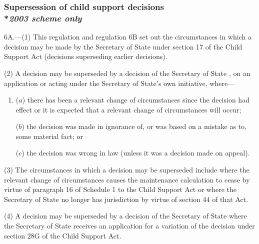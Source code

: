 \documentclass[12pt,a4paper]{article}
\begin{document}

\subsubsection[6A. Supersession of child support decisions]{Supersession of child support decisions\\*\emph{2003 scheme only}}

6A.---(1)  This regulation and regulation 6B set out the circumstances in which a decision may be made by the 
Secretary of State  %
under section 17 of the Child Support Act (decisions superseding earlier decisions).

(2) A decision may be superseded by a decision of the 
Secretary of State%
, on an application or acting under 
the Secretary of State's  %
own initiative, where—
\begin{enumerate}\item[]
($a$) there has been a relevant change of circumstances since the decision had effect or it is expected that a relevant change of circumstances will occur;

($b$) the decision was made in ignorance of, or was based on a mistake as to, some material fact; or

($c$) the decision was wrong in law (unless it was a decision made on appeal).
\end{enumerate}

(3) The circumstances in which a decision may be superseded include where the relevant change of circumstances causes the maintenance calculation to cease by virtue of paragraph 16 of Schedule 1 to the Child Support Act or where the 
Secretary of State  %
no longer has jurisdiction by virtue of section 44 of that Act.

(4) A decision may be superseded by a decision of the 
Secretary of State  %
where the 
Secretary of State  %
receives an application for a variation of the decision under section 28G of the Child Support Act.
\end{document}

